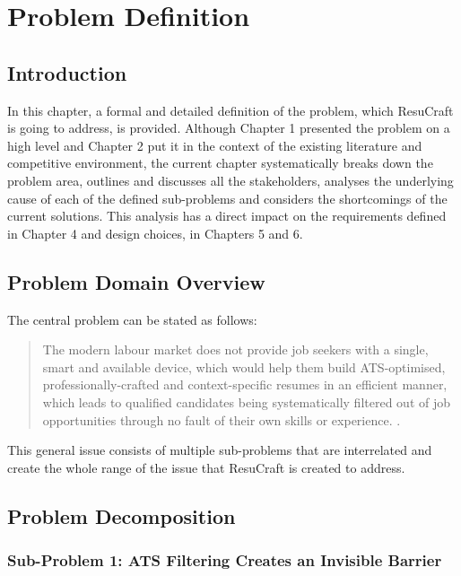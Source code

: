 \documentclass[12pt, a4paper, oneside]{report}
\begin{document}
\chapter{Problem Definition}

\section{Introduction}

In this chapter, a formal and detailed definition of the problem, which ResuCraft is going to address, is provided. Although Chapter 1 presented the problem on a high level and Chapter 2 put it in the context of the existing literature and competitive environment, the current chapter systematically breaks down the problem area, outlines and discusses all the stakeholders, analyses the underlying cause of each of the defined sub-problems and considers the shortcomings of the current solutions. This analysis has a direct impact on the requirements defined in Chapter 4 and design choices, in Chapters 5 and 6.

\section{Problem Domain Overview}

The central problem can be stated as follows:

\begin{quote}
The modern labour market does not provide job seekers with a single, smart and available device, which would help them build ATS-optimised, professionally-crafted and context-specific resumes in an efficient manner, which leads to qualified candidates being systematically filtered out of job opportunities through no fault of their own skills or experience. \cite{jobscan2021}.
\end{quote}

This general issue consists of multiple sub-problems that are interrelated and create the whole range of the issue that ResuCraft is created to address.

\section{Problem Decomposition}

\subsection{Sub-Problem 1: ATS Filtering Creates an Invisible Barrier}
\end{document}
